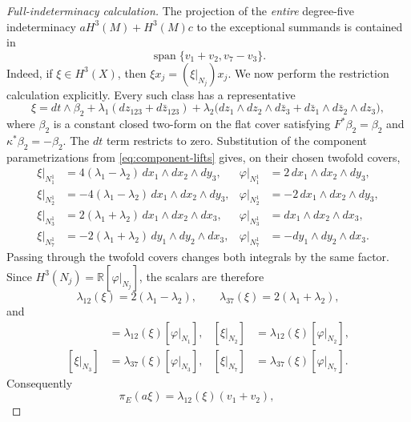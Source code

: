 \documentclass[11pt]{article}
\theoremstyle{remark}\newtheorem{remark}[theorem]{Remark}
\newcommand{\R}{\mathbb R}
\begin{document}
\begin{proof}[Full-indeterminacy calculation]
The projection of the \emph{entire} degree-five indeterminacy
$aH^3(M)+H^3(M)c$ to the exceptional summands is contained in
\begin{equation}\label{eq:indet-projection}
\operatorname{span}\{v_1+v_2,v_7-v_3\}.
\end{equation}
Indeed, if $\xi\in H^3(X)$, then
$\xi x_j=(\xi|_{N_j})x_j$.  We now perform the restriction calculation
explicitly.  Every such class has a representative
\begin{equation}\label{eq:H3X-normal-form}
 \xi=dt\wedge\beta_2
 +\lambda_1(dz_{123}+d\bar z_{123})
 +\lambda_2\bigl(dz_1\wedge dz_2\wedge d\bar z_3
 +d\bar z_1\wedge d\bar z_2\wedge dz_3\bigr),
\end{equation}
where $\beta_2$ is a constant closed two-form on the flat cover satisfying
$F^*\beta_2=\beta_2$ and $\kappa^*\beta_2=-\beta_2$.
The $dt$ term restricts to zero.  Substitution of the component
parametrizations from \eqref{eq:component-lifts} gives, on their chosen
twofold covers,
\begin{align*}
 \xi|_{N_1^1}&=4(\lambda_1-\lambda_2)\,
 dx_1\wedge dx_2\wedge dy_3,&
 \varphi|_{N_1^1}&=2\,dx_1\wedge dx_2\wedge dy_3,\\
 \xi|_{N_2^1}&=-4(\lambda_1-\lambda_2)\,
 dx_1\wedge dx_2\wedge dy_3,&
 \varphi|_{N_2^1}&=-2\,dx_1\wedge dx_2\wedge dy_3,\\
 \xi|_{N_3^1}&=2(\lambda_1+\lambda_2)\,
 dx_1\wedge dx_2\wedge dx_3,&
 \varphi|_{N_3^1}&=dx_1\wedge dx_2\wedge dx_3,\\
 \xi|_{N_7^1}&=-2(\lambda_1+\lambda_2)\,
 dy_1\wedge dy_2\wedge dx_3,&
 \varphi|_{N_7^1}&=-dy_1\wedge dy_2\wedge dx_3.
\end{align*}
Passing through the twofold covers changes both integrals by the same
factor.  Since
$H^3(N_j)=\R[\varphi|_{N_j}]$, the scalars are therefore
\begin{equation}\label{eq:restriction-scalars}
 \lambda_{12}(\xi)=2(\lambda_1-\lambda_2),\qquad
 \lambda_{37}(\xi)=2(\lambda_1+\lambda_2),
\end{equation}
and
\begin{align*}
[\xi|_{N_1}]&=\lambda_{12}(\xi)[\varphi|_{N_1}],&
[\xi|_{N_2}]&=\lambda_{12}(\xi)[\varphi|_{N_2}],\\
[\xi|_{N_3}]&=\lambda_{37}(\xi)[\varphi|_{N_3}],&
[\xi|_{N_7}]&=\lambda_{37}(\xi)[\varphi|_{N_7}].
\end{align*}
Consequently
\begin{equation}\label{eq:base-indet-projection}
\pi_E(a\xi)=\lambda_{12}(\xi)(v_1+v_2),\qquad

\end{equation}
\end{proof}
\end{document}
